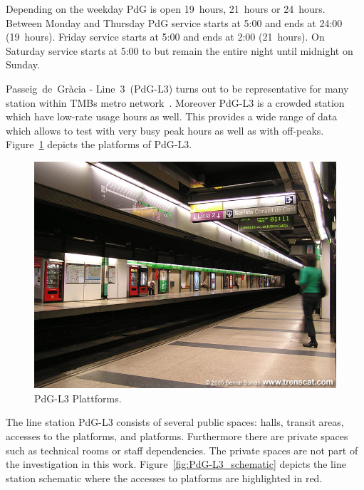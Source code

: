 Depending on the weekday PdG is open 19~hours, 21~hours or 24~hours. Between Monday and Thursday PdG service starts at 5:00 and ends at 24:00 (19~hours). Friday service starts at 5:00 and ends at 2:00 (21~hours). On Saturday service starts at 5:00 to but remain the entire night until midnight on Sunday.

Passeig~de~Gr\`{a}cia - Line~3~(PdG-L3) turns out to be representative for many station within TMBs metro network~\cite{TMB}. Moreover PdG-L3 is a crowded station which have low-rate usage hours as well. This provides a wide range of data which allows to test with very busy peak hours as well as with off-peaks. Figure~\ref{fig:PdG-L3_platforms} depicts the platforms of PdG-L3.

\begin{figure}[htb]
  \centering
  \includegraphics[width=\linewidth]{Figures/PdG-L3_platforms.jpg} 
  \caption{PdG-L3 Plattforms. \cite{TMB}}
  \label{fig:PdG-L3_platforms}
\end{figure}

The line station PdG-L3 consists of several public spaces: halls, transit areas, accesses to the platforms, and platforms. Furthermore there are private spaces such as technical rooms or staff dependencies. The private spaces are not part of the investigation in this work. Figure~\ref{fig:PdG-L3_schematic} depicts the line station schematic where the accesses to platforms are highlighted in red.


